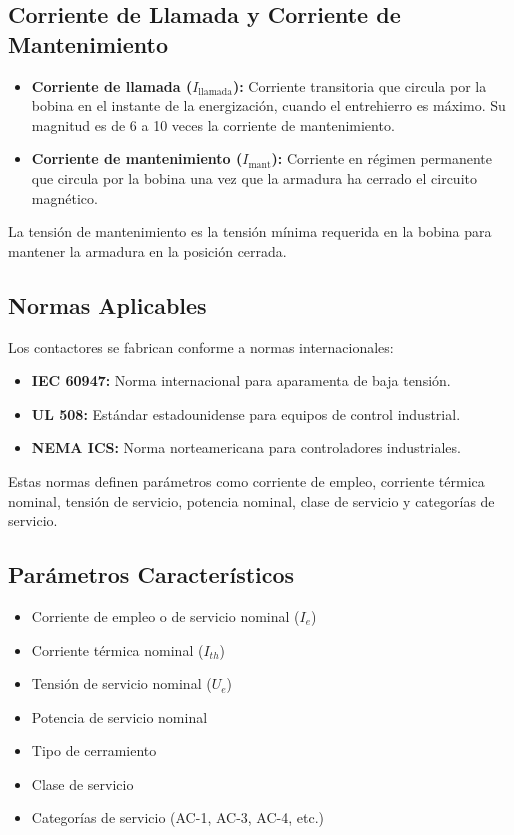 \subsection{Corriente de Llamada y Corriente de Mantenimiento}

\begin{itemize}
    \item \textbf{Corriente de llamada ($I_{\text{llamada}}$):} Corriente transitoria que circula por la bobina en el instante de la energización, cuando el entrehierro es máximo. Su magnitud es de 6 a 10 veces la corriente de mantenimiento.
    \item \textbf{Corriente de mantenimiento ($I_{\text{mant}}$):} Corriente en régimen permanente que circula por la bobina una vez que la armadura ha cerrado el circuito magnético.
\end{itemize}

La tensión de mantenimiento es la tensión mínima requerida en la bobina para mantener la armadura en la posición cerrada.

\subsection{Normas Aplicables}

Los contactores se fabrican conforme a normas internacionales:

\begin{itemize}
    \item \textbf{IEC 60947:} Norma internacional para aparamenta de baja tensión.
    \item \textbf{UL 508:} Estándar estadounidense para equipos de control industrial.
    \item \textbf{NEMA ICS:} Norma norteamericana para controladores industriales.
\end{itemize}

Estas normas definen parámetros como corriente de empleo, corriente térmica nominal, tensión de servicio, potencia nominal, clase de servicio y categorías de servicio.

\subsection{Parámetros Característicos}

\begin{itemize}
    \item Corriente de empleo o de servicio nominal ($I_e$)
    \item Corriente térmica nominal ($I_{th}$)
    \item Tensión de servicio nominal ($U_e$)
    \item Potencia de servicio nominal
    \item Tipo de cerramiento
    \item Clase de servicio
    \item Categorías de servicio (AC-1, AC-3, AC-4, etc.)
\end{itemize}
